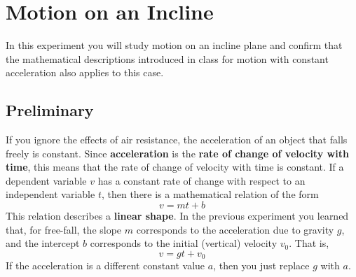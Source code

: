 \setcounter{chapter}{1}
\chapter{Motion on an Incline}
In this experiment you will study motion on an incline plane and confirm that the mathematical descriptions introduced in class for motion with constant acceleration also applies to this case.
\section{Preliminary}
If you ignore the effects of air resistance, the acceleration of an object that falls freely is constant. Since \textbf{acceleration} is the \textbf{rate of change of velocity with time}, this means that the rate of change of velocity with time is constant. If a dependent variable $v$ has a constant rate of change with respect to an independent variable $t$, then there is a mathematical relation of the form
\begin{equation}
    v = m t + b
    \label{eq:02.v.linear}
\end{equation}
This relation describes a \textbf{linear shape}. In the previous experiment you learned that, for free-fall, the slope $m$ corresponds to the acceleration due to gravity $g$, and the intercept $b$ corresponds to the initial (vertical) velocity $v_{0}$. That is,
\begin{equation}
    v = g t + v_{0}
\end{equation}
If the acceleration is a different constant value $a$, then you just replace $g$ with $a$.

